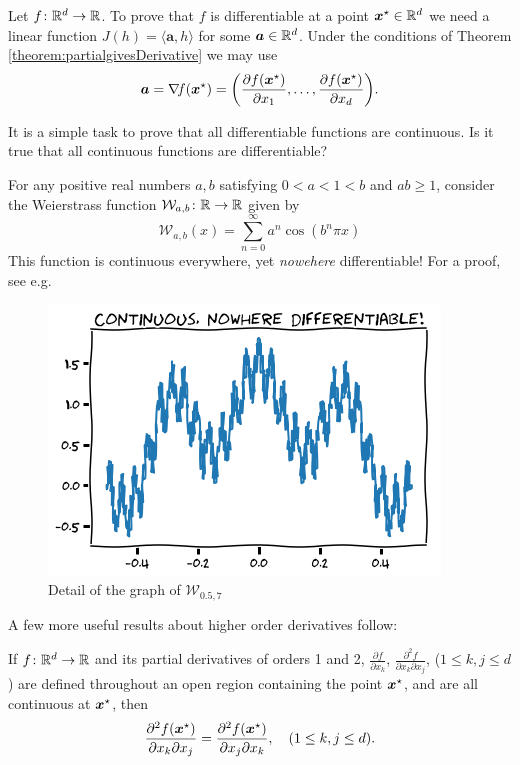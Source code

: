 \begin{example}\label{example:gradient}
Let $f\colon \mathbb{R}^d \to \mathbb{R}$.  To prove that $f$ is differentiable at a point $\boldsymbol{x}^{\star} \in \mathbb{R}^d$ we need a linear function $J(h) = \langle \boldsymbol{a}, h \rangle$ for some $\boldsymbol{a} \in \mathbb{R}^d$.  Under the conditions of Theorem \ref{theorem:partialgivesDerivative} we may use
\begin{equation*}
\boldsymbol{a} = \mathop{\nabla\! {f}}(\boldsymbol{x}^{\star})= \bigg( \frac{\partial f (\boldsymbol{x}^{\star})}{\partial x_1}, \dotsc, \frac{\partial f (\boldsymbol{x}^{\star})}{\partial x_d} \bigg).
\end{equation*}
\end{example}
It is a simple task to prove that all differentiable functions are continuous.  Is it true that all continuous functions are differentiable?

\begin{example}\label{example:WeierstrassFunction}
For any positive real numbers $a, b$ satisfying $0<a<1<b$ and $ab \geq 1$, consider the Weierstrass function $\mathcal{W}_{a,b} \colon \mathbb{R} \to \mathbb{R}$ given by 
\begin{equation*}
\mathcal{W}_{a,b}(x) = \sum_{n=0}^\infty a^n \cos(b^n \pi x)
\end{equation*}
This function is continuous everywhere, yet \emph{nowehere} differentiable!  For a proof, see e.g.~\cite{hardy1916weierstrass}
\begin{figure}[ht!]
\includegraphics[width=0.6\linewidth]{weierstrass.png}
\caption{Detail of the graph of $\mathcal{W}_{0.5, 7}$}
\label{figure:WeierstrassFunction}
\end{figure}
\end{example}

A few more useful results about higher order derivatives follow:

\begin{theorem}[Clairaut]\label{theorem:MixedDerivatives}
If $f\colon \mathbb{R}^d \to \mathbb{R}$ and its partial derivatives of orders 1 and 2, $\frac{\partial f}{\partial x_k}$, $\frac{\partial^2 f}{\partial x_k \partial x_j}$, ($1\leq k,j \leq d$) are defined throughout an open region containing the point $\boldsymbol{x}^{\star}$, and are all continuous at $\boldsymbol{x}^{\star}$, then 
\begin{equation*}
\frac{\partial^2 f(\boldsymbol{x}^{\star})}{\partial x_k \partial x_j} = \frac{\partial^2 f(\boldsymbol{x}^{\star})}{\partial x_j \partial x_k}, \quad (1\leq k,j \leq d). 
\end{equation*}
\end{theorem}

